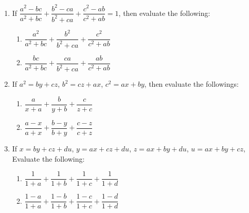 \begin{enumerate}
            \item If $\dfrac{a^2-bc}{a^2+bc}+\dfrac{b^2-ca}{b^2+ca}+\dfrac{c^2-ab}{c^2+ab}=1$, then evaluate the following:
                \begin{enumerate}[label=(\alph*)] 
                    \item $\dfrac{a^2}{a^2+bc}+\dfrac{b^2}{b^2+ca}+\dfrac{c^2}{c^2+ab}$
                    \item $\dfrac{bc}{a^2+bc}+\dfrac{ca}{b^2+ca}+\dfrac{ab}{c^2+ab}$
                \end{enumerate}
            \item If $a^2=by+cz$, $b^2=cz+ax$, $c^2=ax+by$, then evaluate the followings:
                \begin{enumerate}[label=(\alph*)]
                    \item $\dfrac{a}{x+a}+\dfrac{b}{y+b}+\dfrac{c}{z+c}$
                    \item $\dfrac{a-x}{a+x}+\dfrac{b-y}{b+y}+\dfrac{c-z}{c+z}$
                    
                \end{enumerate}
            \item If $x=by+cz+du$, $y=ax+cz+du$, $z=ax+by+du$, $u=ax+by+cz$, Evaluate the following:
                \begin{enumerate}[label=(\alph*)]
                    \item $\dfrac{1}{1+a}+\dfrac{1}{1+b}+\dfrac{1}{1+c}+\dfrac{1}{1+d}$
                    \item $\dfrac{1-a}{1+a}+\dfrac{1-b}{1+b}+\dfrac{1-c}{1+c}+\dfrac{1-d}{1+d}$
                \end{enumerate}


\end{enumerate}
